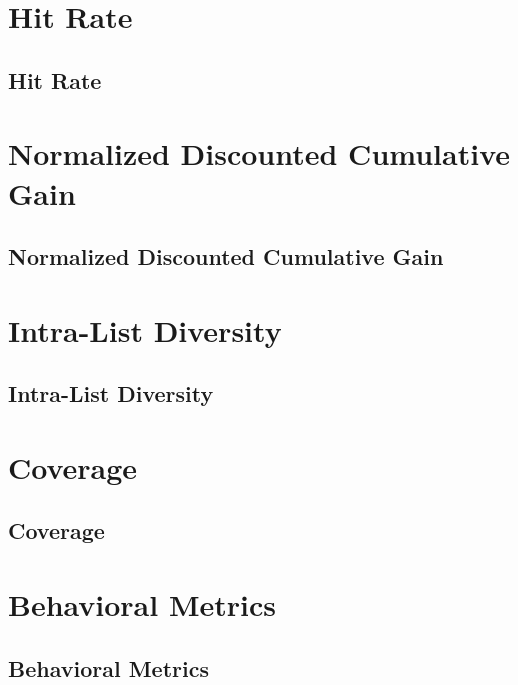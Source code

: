 
\clearpage
\thispagestyle{rankingstyle}
\section{Hit Rate}
\subsection{Hit Rate}

\clearpage
\thispagestyle{rankingstyle}
\section{Normalized Discounted Cumulative Gain}
\subsection{Normalized Discounted Cumulative Gain}

\clearpage
\thispagestyle{rankingstyle}
\section{Intra-List Diversity}
\subsection{Intra-List Diversity}

\clearpage
\thispagestyle{rankingstyle}
\section{Coverage}
\subsection{Coverage}

\clearpage
\thispagestyle{rankingstyle}
\section{Behavioral Metrics}
\subsection{Behavioral Metrics}



